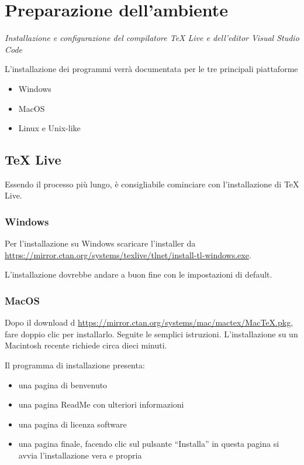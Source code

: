 \documentclass[envcountsame,envcountchap]{svmono}
\begin{document}
\mainmatter%


\chapter{Preparazione dell'ambiente} \label{Cap.1}

\vspace{2cm}

\begin{flushright}
\textit{Installazione e configurazione del compilatore TeX Live e dell'editor Visual Studio Code}
\end{flushright}

\vspace{0.5cm}

L'installazione dei programmi verrà documentata per le tre principali piattaforme
\begin{itemize}
    \item Windows
    \item MacOS
    \item Linux e Unix-like
\end{itemize}

\section{TeX Live}
Essendo il processo più lungo, è consigliabile cominciare con l'installazione di TeX Live.

\subsection{Windows}
Per l'installazione su Windows scaricare l'installer da \url{https://mirror.ctan.org/systems/texlive/tlnet/install-tl-windows.exe}.

L'installazione dovrebbe andare a buon fine con le impostazioni di default.

\subsection{MacOS \citep{installMacTeX}}
Dopo il download d \url{https://mirror.ctan.org/systems/mac/mactex/MacTeX.pkg}, fare doppio clic per installarlo. Seguite le semplici istruzioni. L'installazione su un Macintosh recente richiede circa dieci minuti.

Il programma di installazione presenta:
\begin{itemize}
    \item una pagina di benvenuto
    \item una pagina ReadMe con ulteriori informazioni
    \item una pagina di licenza software
    \item una pagina finale, facendo clic sul pulsante “Installa” in questa pagina si avvia l'installazione vera e propria
\end{itemize}
\end{document}
